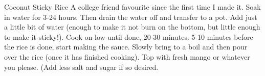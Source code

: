\begin{recipe}{Coconut Sticky Rice}{}{}
\freeform A college friend favourite since the first time I made it.
Soak in water for 3-24 hours. Then drain the water off and transfer to a pot. Add just a little bit of water (enough to make it not burn on the bottom, but little enough to make it sticky!). Cook on low until done, 20-30 minutes. 5-10 minutes before the rice is done, start making the sauce.
Slowly bring to a boil and then pour over the rice (once it has finished cooking). Top with fresh mango or whatever you please. (Add less salt and sugar if so desired.
\end{recipe}
